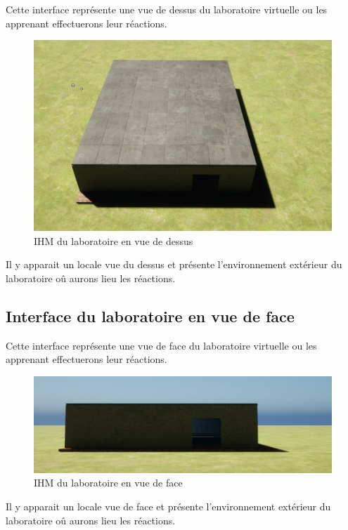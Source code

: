 Cette interface représente une vue de dessus du laboratoire virtuelle ou les apprenant effectuerons leur réactions.

\begin{figure}[H]
	\centering
	\includegraphics[width=1\textwidth]{img/labot}
	\caption{IHM du laboratoire en vue de dessus}
	\label{fig:mesh1}
\end{figure}

Il y apparait un locale vue du dessus et présente l'environnement extérieur du laboratoire oû aurons lieu les réactions.

\subsection{Interface du laboratoire en vue de face}

Cette interface représente une vue de face du laboratoire virtuelle ou les apprenant effectuerons leur réactions.

\begin{figure}[H]
	\centering
	\includegraphics[width=1\textwidth]{img/labof}
	\caption{IHM du laboratoire en vue de face}
	\label{fig:mesh1}
\end{figure}

Il y apparait un locale vue de face et présente l'environnement extérieur du laboratoire oû aurons lieu les réactions.

